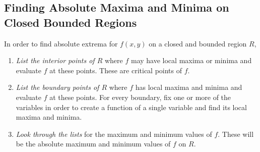 \documentclass[12pt]{article}
\theoremstyle{break}
\numberwithin{theorem}{subsection}
\numberwithin{lemma}{subsection}
\numberwithin{corollary}{subsection}
\numberwithin{equation}{subsection}
\begin{document}
\subsection{Finding Absolute Maxima and Minima on Closed Bounded Regions}
In order to find absolute extrema for $f(x,y)$ on a closed and bounded region $R$, 
\begin{enumerate}
\item \textit{List the interior points of $R$} where $f$ may have local maxima or minima and 
	evaluate $f$ at these points. These are critical points of $f$.
\item \textit{List the boundary points of $R$} where $f$ has local maxima and minima and evaluate 
	$f$ at these points. For every boundary, fix one or more of the variables in order to create a
	function of a single variable and find its local maxima and minima. 
\item \textit{Look through the lists} for the maximum and minimum values of $f$. These will be the
	absolute maximum and minimum values of $f$ on $R$.
\end{enumerate}
\end{document}
